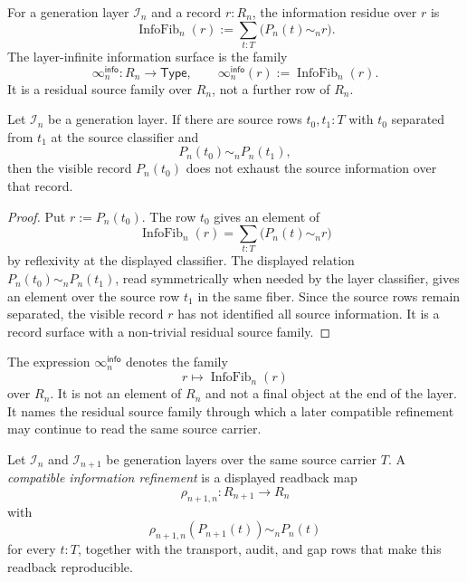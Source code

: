 \begin{definition}
\label{def:constructive-information-residue}
For a generation layer $\mathcal I_n$ and a record $r:R_n$, the
information residue over $r$ is
$$
\operatorname{InfoFib}_n(r)
:=
\sum_{t:T}\bigl(P_n(t)\sim_n r\bigr).
$$
The layer-infinite information surface is the family
$$
\infty_n^{\mathsf{info}}:R_n\to\mathsf{Type},
\qquad
\infty_n^{\mathsf{info}}(r)
:=
\operatorname{InfoFib}_n(r).
$$
It is a residual source family over $R_n$, not a further row of $R_n$.
\end{definition}

\begin{theorem}
\label{thm:visible-records-need-not-exhaust-source-rows}
Let $\mathcal I_n$ be a generation layer. If there are source rows
$t_0,t_1:T$ with $t_0$ separated from $t_1$ at the source classifier and
$$
P_n(t_0)\sim_n P_n(t_1),
$$
then the visible record $P_n(t_0)$ does not exhaust the source
information over that record.
\end{theorem}

\begin{proof}
Put $r:=P_n(t_0)$. The row $t_0$ gives an element of
$$
\operatorname{InfoFib}_n(r)
=
\sum_{t:T}\bigl(P_n(t)\sim_n r\bigr)
$$
by reflexivity at the displayed classifier. The displayed relation
$P_n(t_0)\sim_n P_n(t_1)$, read symmetrically when needed by the layer
classifier, gives an element over the source row $t_1$ in the same
fiber. Since the source rows remain separated, the visible record $r$
has not identified all source information. It is a record surface with a
non-trivial residual source family.
\end{proof}

\begin{principle}
\label{prin:layer-infinity-not-terminal-record}
The expression $\infty_n^{\mathsf{info}}$ denotes the family
$$
r\mapsto\operatorname{InfoFib}_n(r)
$$
over $R_n$. It is not an element of $R_n$ and not a final object at the
end of the layer. It names the residual source family through which a
later compatible refinement may continue to read the same source
carrier.
\end{principle}

\begin{definition}
\label{def:compatible-information-refinement}
Let $\mathcal I_n$ and $\mathcal I_{n+1}$ be generation layers over the
same source carrier $T$. A \emph{compatible information refinement} is a
displayed readback map
$$
\rho_{n+1,n}:R_{n+1}\to R_n
$$
with
$$
\rho_{n+1,n}(P_{n+1}(t))\sim_n P_n(t)
$$
for every $t:T$, together with the transport, audit, and gap rows that
make this readback reproducible.
\end{definition}

